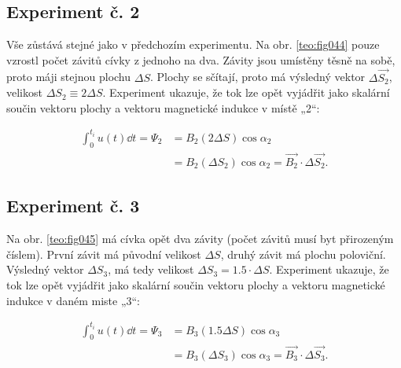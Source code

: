       \subsection{Experiment č. 2}
        Vše zůstává stejné jako v předchozím experimentu. Na obr. \ref{teo:fig044} pouze vzrostl
        počet závitů cívky z jednoho na dva. Závity jsou umístěny těsně na sobě, proto máji stejnou
        plochu \(\Delta S\). Plochy se sčítají, proto má výsledný vektor \(\Delta \vec{S_2}\),
        velikost \(\Delta S_2\equiv2\Delta S\). Experiment ukazuje, že tok lze opět vyjádřit jako
        skalární součin vektoru plochy a vektoru magnetické indukce v místě „2“:

        
        \begin{align}
          \int_0^{t_i} u(t)\dd{t} = \Psi_2 
             &= B_2(2\Delta S)\cos\alpha_2                           \nonumber \\
             &= B_2(\Delta S_2)\cos\alpha_2 
              = \vec{B_2}\cdot\Delta\vec{S_2}.                       \label{ES:eq_zakl_elm08}
        \end{align}

      \subsection{Experiment č. 3}
        Na obr. \ref{teo:fig045} má cívka opět dva závity (počet závitů musí byt 
        přirozeným číslem). První závit má původní velikost \(\Delta S\), druhý závit má plochu 
        poloviční. Výsledný vektor \(\Delta S_3\), má tedy velikost \(\Delta S_3 = 
        \num{1.5}\cdot\Delta S\). Experiment ukazuje, že tok lze opět vyjádřit jako skalární součin 
        vektoru plochy a vektoru magnetické indukce v daném miste „3“:


         \begin{align}
           \int_0^{t_i} u(t)\dd{t} = \Psi_3 
             &= B_3(\num{1.5}\Delta S)\cos\alpha_3                  \nonumber  \\
             &= B_3(\Delta S_3)\cos\alpha_3 
              = \vec{B_3}\cdot\Delta\vec{S_3}.                      \label{ES:eq_zakl_elm09}
         \end{align}
         

